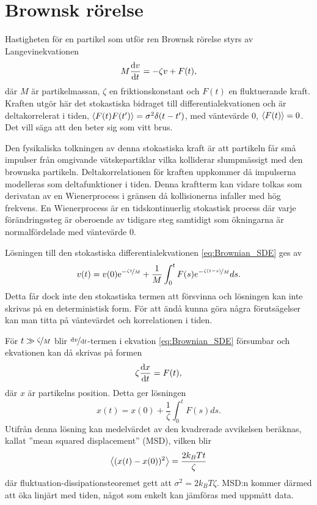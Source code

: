 \section{Brownsk rörelse}\label{sec:brown}
Hastigheten för en partikel som utför ren Brownsk rörelse styrs av
Langevinekvationen~\cite{Mazo_Brownian2002} 
\begin{equation} \label{eq:Brownian_SDE}
    M\dv{v}{t}=-\zeta v + F(t),
\end{equation}
där $M$ är partikelmassan, $\zeta$ en friktionskonstant och $F(t)$ en
fluktuerande kraft. Kraften utgör här det stokastiska bidraget till
differentialekvationen och är deltakorrelerat i tiden,
$\ev{F(t)F(t')}=\sigma^2\delta(t-t')$, 
med väntevärde 0, $\ev{F(t)}=0$. 
Det vill säga att den beter sig som vitt brus. 

Den fysikaliska tolkningen av denna stokastiska kraft är att partikeln
får små impulser från omgivande vätskepartiklar vilka kolliderar
slumpmässigt med den brownska partikeln.  Deltakorrelationen för
kraften uppkommer då impulserna modelleras som deltafunktioner i
tiden. Denna kraftterm kan vidare tolkas som derivatan av en
Wienerprocess i gränsen då kollisionerna infaller med hög frekvens. En
Wienerprocess är en tidskontinuerlig stokastisk process där varje
förändringssteg är oberoende av tidigare steg samtidigt som
ökningarna är normalfördelade med
väntevärde 0.

Lösningen till den stokastiska differentialekvationen \eqref{eq:Brownian_SDE} ges av 
\begin{equation}
    v(t)=v(0)\mathrm{e}^{-\nicefrac{\zeta t}{M}}+\frac{1}{M}\int^t_0 F(s)e^{-\nicefrac{\zeta (t-s)}{M}}ds.
\end{equation}
Detta får dock inte den stokastiska termen att försvinna och lösningen kan inte skrivas på en deterministisk form. För att ändå kunna göra några förutsägelser kan man titta på väntevärdet och korrelationen i tiden.

För $t \gg \nicefrac{\zeta}{M}$ blir $\nicefrac{\dd{v}}{\dd{t}}$-termen i ekvation \eqref{eq:Brownian_SDE} försumbar  och ekvationen kan då skrivas på formen
\begin{equation}
    \zeta \dv{x}{t}=F(t),
\end{equation}
där $x$ är partikelns position. Detta ger lösningen
\begin{equation}
    x(t)=x(0)+\frac{1}{\zeta} \int^t_0 F(s)ds.
\end{equation}
Utifrån denna lösning kan medelvärdet av den kvadrerade avvikelsen beräknas, kallat ''mean squared displacement'' (MSD), vilken blir 
\begin{equation}
    \ev{(x(t)-x(0))^2}=\frac{2k_BTt}{\zeta}
\end{equation}
där fluktuation-dissipationsteoremet gett att $\sigma^2=2k_BT\zeta$.  MSD:n kommer därmed att öka linjärt med tiden, något som enkelt kan jämföras med uppmätt data.




